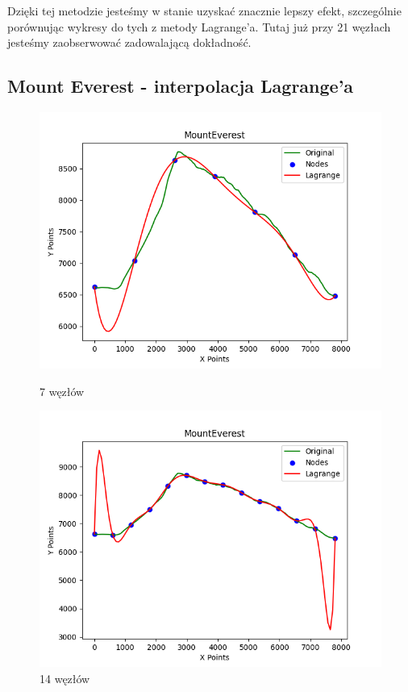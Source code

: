 \documentclass{article}
\begin{document}
Dzięki tej metodzie jesteśmy w stanie uzyskać znacznie lepszy efekt, szczególnie porównując wykresy do tych z metody Lagrange'a. Tutaj już przy 21 węzłach jesteśmy zaobserwować zadowalającą dokładność.

\subsection{Mount Everest - interpolacja Lagrange'a}

\begin{figure}[H]
    \centering
    \begin{minipage}[b]{0.49\textwidth}
        \centering
        \includegraphics[width=\textwidth]{plots/MountEverest_lagrange_7.png}
        \caption{7 węzłów}
        \label{fig:7nodes}
    \end{minipage}
    \hfill
    \begin{minipage}[b]{0.49\textwidth}
        \centering
        \includegraphics[width=\textwidth]{plots/MountEverest_lagrange_14.png}
        \caption{14 węzłów}
        \label{fig:14nodes}
    \end{minipage}
\end{figure}
\end{document}
